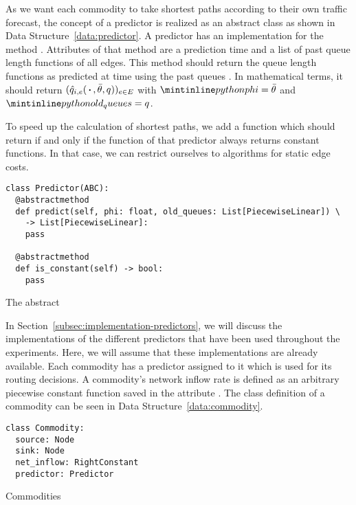 As we want each commodity to take shortest paths according to their own traffic forecast, the concept of a predictor is realized as an abstract class as shown in Data Structure~\ref{data:predictor}.
A predictor has an implementation for the method . Attributes of that method are a prediction time  and a list  of past queue length functions of all edges.
This method should return the queue length functions as predicted at time  using the past queues .
In mathematical terms, it should return $(\hat q_{i,e}(\,\boldsymbol{\cdot}\,, \bar\theta, q))_{e\in E}$ with $\code{phi}= \bar\theta$ and $\code{old_queues} = q$.

To speed up the calculation of shortest paths, we add a function  which should return  if and only if the  function of that predictor always returns constant functions.
In that case, we can restrict ourselves to algorithms for static edge costs.

\begin{classdef}
  \begin{verbatim}
class Predictor(ABC):
  @abstractmethod
  def predict(self, phi: float, old_queues: List[PiecewiseLinear]) \
    -> List[PiecewiseLinear]:
    pass
  
  @abstractmethod
  def is_constant(self) -> bool:
    pass
\end{verbatim}
\caption{The abstract }
\label{data:predictor}
\end{classdef}


In Section~\ref{subsec:implementation-predictors}, we will discuss the implementations of the different predictors that have been used throughout the experiments.
Here, we will assume that these implementations are already available.
Each commodity has a predictor assigned to it which is used for its routing decisions.
A commodity's network inflow rate is defined as an arbitrary piecewise constant function saved in the attribute . 
The class definition of a commodity can be seen in Data Structure~\ref{data:commodity}.

\begin{classdef}
    \begin{verbatim}
class Commodity:
  source: Node
  sink: Node
  net_inflow: RightConstant
  predictor: Predictor
\end{verbatim}
\caption{Commodities}%
\label{data:commodity}
\end{classdef}

